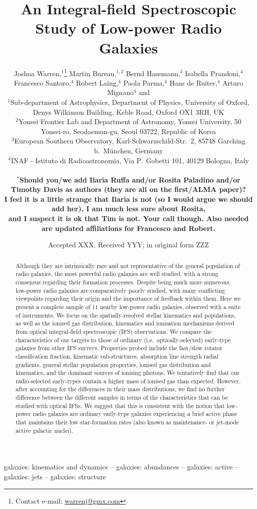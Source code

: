 \documentclass[a4paper,fleqn,usenatbib]{mnras}
\title[IFS Study of Low-power Radio Galaxies]{An Integral-field
  Spectroscopic Study of Low-power Radio Galaxies}
\author[J. Warren et al.]{
  Joshua Warren,$^{1}$\thanks{Contact e-mail:
    \href{mailto:warrenj@gmx.com}{warrenj@gmx.com}}
  Martin Bureau,$^{1,2}$ Bernd Hasemann,$^{3}$ \added{Ilaria Ruffa,$^{4}$} Isabella
  Prandoni,$^{4}$ \newauthor Francesco Santoro,$^{4}$ Robert
  Laing,$^{4}$ Paola Parma,$^{4}$ \added{Rosita Paladino,$^{4}$} Hans de Ruiter,$^{4}$ \newauthor
  Arturo Mignano$^{4}$ and \added{Timothy Davis$^{5}$}
  \\
  $^{1}$Sub-department of Astrophysics, Department of Physics,
  University of Oxford, Denys Wilkinson Building, Keble Road, Oxford
  OX1 3RH, UK\\
  $^{2}$Yonsei Frontier Lab and Department of Astronomy, Yonsei
  University, 50 Yonsei-ro, Seodaemun-gu, Seoul 03722, Republic of
  Korea\\
  $^{3}$European Southern Observatory, Karl-Schwarzschild-Str.\ 2,
  85748 Garching b.\ M{\"u}nchen, Germany\\
  $^{4}$INAF - Istituto di Radioastronomia, Via P.\ Gobetti 101, 40129
  Bologna, Italy\\
  \added{$^{5}$School of Physics \& Astronomy, Cardiff University, Queens Buildings, The Parade, Cardiff CF24 3AA, UK}\\
  $^*${\bf Should you/we add Ilaria Ruffa and/or Rosita Paladino
    and/or Timothy Davis as authors (they are all on the first/ALMA
    paper)?}\\{\bf I feel it is a little strange that Ilaria is not (so I
    would argue we should add her), I am much less sure about
    Rosita,}\\ {\bf and I suspect it is ok that Tim is not. Your call
    though. Also needed are updated affiliations for Francesco and
    Robert.}}
\date{Accepted XXX. Received YYY; in original form ZZZ}
\begin{document}
\label{firstpage}
\pagerange{\pageref{firstpage}--\pageref{lastpage}}
\maketitle

\begin{abstract}
  Although they are intrinsically rare and not representative of the
  general population of radio galaxies, the most powerful radio
  galaxies are well studied, with a strong consensus regarding their
  formation processes. Despite being much more numerous, low-power
  radio galaxies are comparatively poorly studied, with many
  conflicting viewpoints regarding their origin and the importance of
  feedback within them. Here we present a complete sample of $11$
  nearby low-power radio galaxies, observed with a suite of
  instruments. We focus on the spatially-resolved stellar kinematics
  and populations, as well as the ionised gas distribution, kinematics
  and ionisation mechanisms derived from optical integral-field
  spectroscopic (IFS) observations.
  We compare the characteristics of our targets to those of ordinary
  (i.e.\ optically-selected) early-type galaxies from other IFS
  surveys.
  Properties probed include the fast/slow rotator classification
  fraction, kinematic sub-structures, absorption line strength radial
  gradients, general stellar population properties, ionised gas
  distribution and kinematics, and the dominant sources of ionising
  photons. We tentatively find that our radio-selected early-types
  contain a higher mass of ionised gas than expected. However, after
  accounting for the differences in their mass distributions, we find
  no further difference between the different samples in terms of the
  characteristics that can be studied with optical IFSs. We suggest
  that this is consistent with the notion that low-power radio
  galaxies are ordinary early-type galaxies experiencing a brief
  active phase that maintains their low star-formation rates (also
  known as maintenance- or jet-mode active galactic nuclei).
\end{abstract}

\begin{keywords}
galaxies: kinematics and dynamics -- galaxies: abundances -- galaxies: active -- galaxies: jets -- galaxies: structure
\end{keywords}
\end{document}
